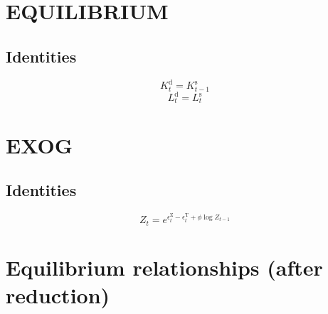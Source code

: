 \section{EQUILIBRIUM}

\subsection{Identities}

\begin{equation}
K^{\mathrm{d}}_{t} = K^{\mathrm{s}}_{t-1}
\end{equation}
\begin{equation}
L^{\mathrm{d}}_{t} = L^{\mathrm{s}}_{t}
\end{equation}




\section{EXOG}

\subsection{Identities}

\begin{equation}
Z_{t} = e^{\epsilon^{\mathrm{Z}}_{t} - \epsilon^{\mathrm{T}}_{t} + {\phi} {\log{Z_{t-1}}}}
\end{equation}




\section{Equilibrium relationships (after reduction)}

